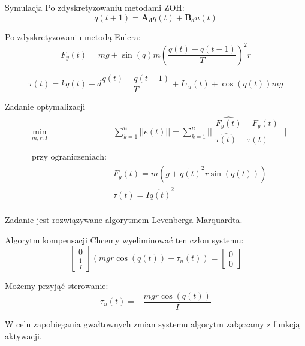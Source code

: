 \documentclass{beamer}
\begin{document}
\begin{frame}{Symulacja}
Po zdyskretyzowaniu metodami ZOH:
\begin{equation}
q(t+1) = \mathbf{A_d}q(t) + \mathbf{B}_du(t)
\label{eq:dyskretny}
\end{equation}

Po zdyskretyzowaniu metodą Eulera:
\begin{equation}
F_{y}(t) = mg + \sin{(q)}m(\frac{q(t)-q(t-1)}{T})^2 r
\end{equation}

\begin{equation}
\tau(t) = kq(t) + d\frac{q(t)-q(t-1)}{T} + I\tau_u(t) + \cos(q(t))mg
\end{equation}
\end{frame}

\begin{frame}{Zadanie optymalizacji}
\begin{equation}
\begin{aligned}
& \underset{m, r, I}{\text{min}}
&  \sum_{k=1}^{n} || e(t) || = \sum_{k = 1}^{n} || \begin{matrix}
\hat{F_y(t)}-F_y(t) \\
\hat{\tau(t)}-\tau(t) \\
\end{matrix} || \\
& \text{przy ograniczeniach:}\\
& & F_{y}(t) = m(g + \dot{q(t)}^2r\sin{(q(t))})\\
& & \tau(t) = I\ddot{q(t)}^2\\
\end{aligned}
\end{equation}

Zadanie jest rozwiązywane algorytmem Levenberga-Marquardta.
\end{frame}

\begin{frame}{Algorytm kompensacji}
Chcemy wyeliminować ten człon systemu:
\begin{equation}
	\begin{bmatrix}
	0 \\
	\frac{1}{I}
	\end{bmatrix}
	(mgr\cos{(q(t))} + \tau_u(t)) = 	\begin{bmatrix}
	0 \\
	0
	\end{bmatrix}
\end{equation}

Możemy przyjąć sterowanie:
\begin{equation}
\tau_u(t) = -\frac{mgr\cos{(q(t))}}{I}
\end{equation}

W celu zapobiegania gwałtownych zmian systemu algorytm załączamy z funkcją aktywacji.
\end{frame}
\end{document}
